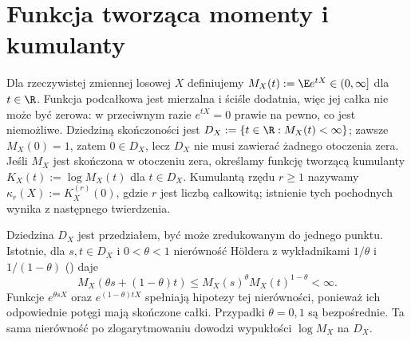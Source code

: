 \section{Funkcja tworząca momenty i kumulanty}

\begin{definicja}
Dla rzeczywistej zmiennej losowej $X$ definiujemy
$M_X(t):=\E e^{tX}\in(0,\infty]$ dla $t\in\R$.
Funkcja podcałkowa jest mierzalna i ściśle dodatnia,
więc jej całka nie może być zerowa: w przeciwnym razie $e^{tX}=0$
prawie na pewno, co jest niemożliwe.
Dziedziną skończoności jest $D_X:=\{t\in\R:M_X(t)<\infty\}$;
zawsze $M_X(0)=1$, zatem $0\in D_X$, lecz $D_X$
nie musi zawierać żadnego otoczenia zera.
Jeśli $M_X$ jest skończona w otoczeniu zera, określamy
funkcję tworzącą kumulanty $K_X(t):=\log M_X(t)$ dla $t\in D_X$.
Kumulantą rzędu $r\geq1$ nazywamy $\kappa_r(X):=K_X^{(r)}(0)$,
gdzie $r$ jest liczbą całkowitą; istnienie tych pochodnych
wynika z następnego twierdzenia.
\end{definicja}

Dziedzina $D_X$ jest przedziałem, być może zredukowanym
do jednego punktu. Istotnie, dla $s,t\in D_X$ i $0<\theta<1$
nierówność Höldera z wykładnikami $1/\theta$ i $1/(1-\theta)$
() daje
\[
M_X(\theta s+(1-\theta)t)
\leq M_X(s)^\theta M_X(t)^{1-\theta}<\infty.
\]
Funkcje $e^{\theta sX}$ oraz $e^{(1-\theta)tX}$ spełniają
hipotezy tej nierówności, ponieważ ich odpowiednie potęgi
mają skończone całki. Przypadki $\theta=0,1$ są bezpośrednie.
Ta sama nierówność po zlogarytmowaniu dowodzi wypukłości
$\log M_X$ na $D_X$.

